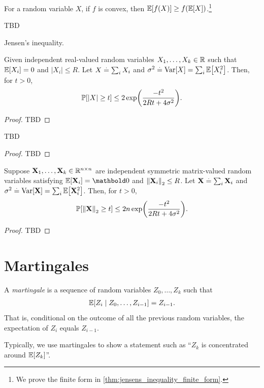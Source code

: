 \begin{fct}
For a random variable $X$, if $f$ is convex, then $\E{f(X)} \geq f(\E{X})$.\footnote{We prove the finite form in \cref{thm:jensens_inequality_finite_form}.}
\end{fct}
\begin{marginfigure}
TBD
\caption{Jensen's inequality.}
\end{marginfigure}

\begin{thm} Given independent real-valued random variables $X_1, \dots, X_k \in \mathbb{R}$ such that $\E{X_i} = 0$ and $|X_i| \leq R$. Let $X \overset{.}{=} \sum_i X_i$ and $\sigma^2 \defeq \Var{X} = \sum_i \E{X_i^2}$. Then, for $t > 0$, \begin{align}
    \Pr{|X| \geq t} \leq 2 \exp\parentheses*{\frac{-t^2}{2Rt + 4\sigma^2}}.
\end{align}
\end{thm}
\begin{proof}
TBD
\end{proof}

\begin{cor}
TBD
\end{cor}
\begin{proof}
TBD
\end{proof}

\begin{thm} Suppose $\mathbf{X}_1, \dots, \mathbf{X}_k \in \mathbb{R}^{n \times n}$ are independent symmetric matrix-valued random variables satisfying $\E{\rX_i} = \mZero$ and $\left\| \mathbf{X}_i \right\|_2 \leq R$. Let $\mathbf{X} \overset{.}{=} \sum_i \mathbf{X}_i$ and $\sigma^2 \defeq \Var{\rX} = \sum_i \E{\rX_i^2}$. Then, for $t > 0$, \begin{align}
    \Pr{\norm{\rX}_2 \geq t} \leq 2 n \exp\parentheses*{\frac{-t^2}{2Rt + 4\sigma^2}}.
\end{align}
\end{thm}
\begin{proof}
TBD
\end{proof}

\section{Martingales}

\begin{defn}[Martingale] A \emph{martingale} is a sequence of random variables $Z_0, \dots, Z_k$ such that \begin{align}
    \E{Z_i \mid Z_0, \dots, Z_{i-1}} = Z_{i-1}.
\end{align} That is, conditional on the outcome of all the previous random variables, the expectation of $Z_i$ equals $Z_{i-1}$.%
\end{defn} Typically, we use martingales to show a statement such as ``$Z_k$ is concentrated around $\E{Z_k}$''.

